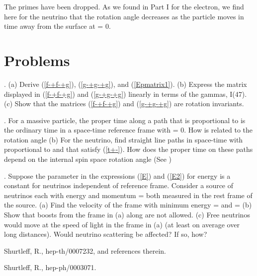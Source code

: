 \documentclass[a4paper,12pt]{article}
\begin{document}
The primes have been dropped. As we found in Part I for the electron, we find here for the neutrino that the rotation angle \myHighlight{$\theta$}\coordHE{} decreases as the particle moves in time away from the surface \coordHE{} at \coordHE{} = 0. 

\pagebreak
	
\appendix



 \section{Problems} %

. (a) Derive (\ref{f-+f-+g}), (\ref{g-+g-+g}), and (\ref{Epmatrix1}). (b) Express the matrix displayed in (\ref{f-+f-+g}) and (\ref{g-+g-+g}) linearly in terms of the gammas, I(47). (c) Show that the matrices (\ref{f-+f-+g}) and (\ref{g-+g-+g}) are rotation invariants.

\vspace{0.3cm}
. For a massive particle, the proper time \myHighlight{$\tau$}\coordHE{} along a path \coordHE{} that is proportional to \coordHE{} is the ordinary time \coordHE{} in a space-time reference frame with \coordHE{} = 0. How is \myHighlight{$\tau$}\coordHE{} related to the rotation angle \coordHE{} (b) For the neutrino, find straight line paths \coordHE{} in space-time with \coordHE{} proportional to \coordHE{} and that satisfy (\ref{t+-}). How does the proper time on these paths depend on the internal spin space rotation angle \coordHE{} (See \cite{backnu})

\vspace{0.3cm}
. Suppose the parameter \coordHE{} in the expressions (\ref{E}) and (\ref{E2}) for energy \coordHE{} is a constant for neutrinos independent of reference frame. Consider a source of neutrinos each with energy \coordHE{} and momentum \coordHE{} = \coordHE{} both measured in the rest frame of the source. (a) Find the velocity of the frame with minimum energy \coordHE{} = \coordHE{} and \coordHE{} = \coordHE{} (b) Show that boosts from the frame in (a) along \coordHE{} are not allowed. (c) Free neutrinos would move at the speed of light in the frame in (a) (at least on average over long distances). Would neutrino scattering be affected? If so, how?

\begin{thebibliography}{9}

 Shurtleff, R., hep-th/0007232, and references therein.

 Shurtleff, R., hep-ph/0003071.


\end{thebibliography}
\end{document}
